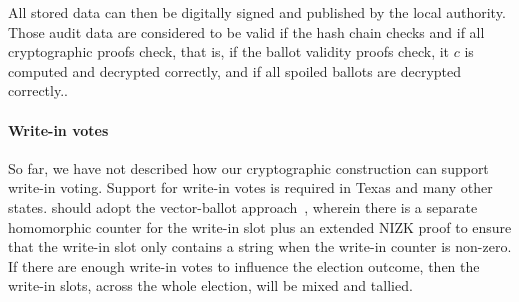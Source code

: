 All stored data can then be digitally signed and published by the
local authority. Those audit data are considered to be valid if the
hash chain checks and if all cryptographic proofs check, that is, if
the ballot validity proofs check, it $c$ is computed and decrypted
correctly, and if all spoiled ballots are decrypted correctly..

\paragraph{Write-in votes}
So far, we have not described how our cryptographic construction can
support write-in voting. Support for write-in votes is required in Texas
and many other states. \projname should adopt
the vector-ballot approach~\cite{kiayias04vectorBallot}, wherein there
is a separate homomorphic counter for the write-in slot plus
an extended NIZK proof to ensure that the write-in slot only contains
a string when the write-in counter is non-zero. If there are enough
write-in votes to influence the election outcome, then the write-in slots, across the whole
election, will be mixed and tallied.




